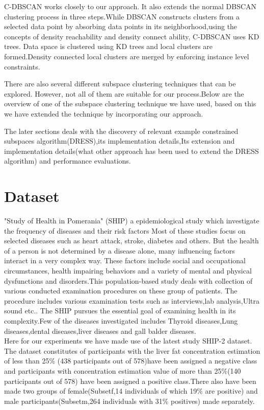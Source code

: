 \documentclass[10pt, conference, compsocconf]{IEEEtran}
\begin{document}
C-DBSCAN works closely to our approach. It also extends the normal DBSCAN clustering process in three steps.While DBSCAN constructs clusters from a selected data point by absorbing data points in its neighborhood,using the concepts of density reachability and density connect ability, C-DBSCAN uses KD trees. Data space is clustered using KD trees and local clusters are formed.Density connected local clusters are merged by enforcing instance level constraints.


There are also several different subspace clustering techniques that can be explored. However, not all of them are suitable for our process.Below are the overview of one of the subspace clustering technique we have used, based on this we have extended the technique by incorporating our approach.



The later sections deals with the discovery of relevant example constrained subspaces algorithm(DRESS),its implementation details,Its extension and implementation details(what other approach has been used to extend the DRESS algorithm) and performance evaluations.

\section{Dataset}
"Study of Health in Pomerania" (SHIP) a epidemiological study which investigate the frequency of diseases and their risk factors
Most of these studies focus on selected diseases such as heart attack, stroke, diabetes and others. But the health of a person is not determined by a disease alone, many influencing factors interact in a very complex way. These factors include social and occupational circumstances, health impairing behaviors and a variety of mental and physical dysfunctions and disorders.This population-based study deals with collection of various conducted examination procedures on these group of patients. The procedure includes various examination tests such as interviews,lab analysis,Ultra sound etc..
The SHIP pursues the essential goal of examining health in its complexity.Few of the diseases investigated includes Thyroid diseases,Lung diseases,dental diseases,liver diseases and gall balder diseases.\\
Here for our experiments we have made use of the latest study SHIP-2 dataset. The dataset constitutes of participants with the liver fat concentration estimation of less than 25\% (438 participants out of 578)have been assigned a negative class and participants with concentration estimation value of more than 25\%(140 participants out of 578) have been assigned a positive class.There also have been made two groups of female(Subsetf,14 individuals of which 19\% are positive) and male participants(Subsetm,264 individuals with 31\% positives) made separately.\cite{tommy}
\end{document}

